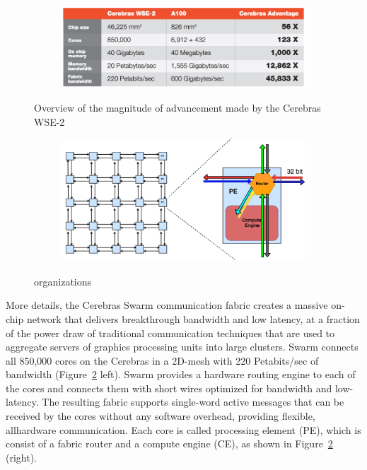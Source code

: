 \begin{figure}[t!]
  \centering
  \begin{subfigure}{0.90\columnwidth}
    \includegraphics[width=\linewidth]{figures/wse2_vs_a100.png}
  \end{subfigure}
  \caption{Overview of the magnitude of advancement made by the Cerebras WSE-2}
  \label{fig:wse2_vs_a100}
\end{figure}



\begin{figure}[b!]
  \centering
  \begin{subfigure}{0.90\columnwidth}
    \includegraphics[width=\linewidth]{figures/pe.png}
  \end{subfigure}
  \caption{\wse organizations}
  \label{fig:pe}
\end{figure}



More details, the Cerebras Swarm communication fabric creates a massive on-chip network that delivers breakthrough bandwidth and low latency, at a fraction of the power draw of traditional communication techniques that are used to aggregate servers of graphics processing units into large clusters.
%
Swarm connects all 850,000 cores on the Cerebras \wse in a 2D-mesh with 220 Petabits/sec of
bandwidth (Figure~\ref{fig:pe} left).
%
Swarm provides a hardware routing engine to each of the cores and connects them with short wires optimized for bandwidth and low-latency. 
%
The resulting fabric supports single-word active messages that can be received by the cores without any software overhead, providing flexible, allhardware communication.
%
%
Each core is called processing element (PE), which is consist of a fabric router and a compute engine (CE), as shown in Figure~\ref{fig:pe} (right).


